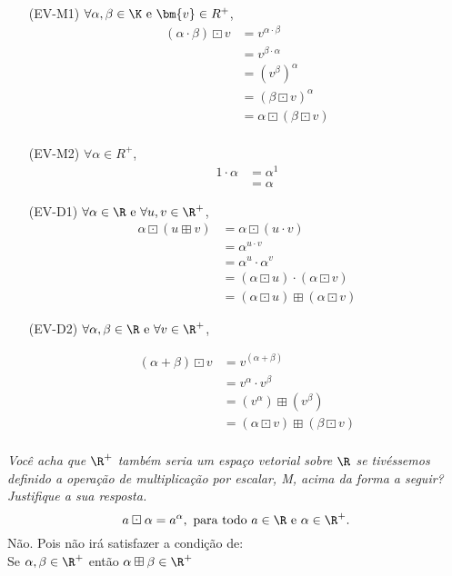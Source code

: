 \begin{itemize}

\item [(EV-M1)] $\forall \alpha, \beta \in \K \text{ e } \bm{v} \in R^{+}$, 
\begin{align*}
    (\alpha \cdot \beta)\boxdot v
    &= v^{\alpha \cdot \beta} \\
    &= v^{\beta \cdot \alpha} \\
    &= (v^\beta)^\alpha \\
    &= (\beta \boxdot v)^\alpha \\
    &= \alpha \boxdot (\beta \boxdot v) \\
\end{align*}


\item [(EV-M2)] $\forall \alpha \in R^{+}$,
\begin{align*}
    1 \cdot \alpha &= \alpha ^1 \\
              &= \alpha
\end{align*}
\end{itemize}

\begin{itemize}
\item [(EV-D1)] $\forall \alpha \in \R \text{ e } \forall u, v \in \R^{+}$,
    \begin{align*}
        \alpha \boxdot (u \boxplus v) &= \alpha \boxdot (u \cdot v) \\
        &= \alpha^{u \cdot v} \\
        &= \alpha^u \cdot \alpha^v \\
        &= (\alpha \boxdot u) \cdot (\alpha \boxdot v) \\
        &= (\alpha \boxdot u) \boxplus (\alpha \boxdot v)
    \end{align*}

\item [(EV-D2)] $\forall \alpha, \beta \in \R \text{ e } \forall v \in \R^{+}$,

\begin{align*}
    (\alpha + \beta) \boxdot v
    &= v^(\alpha + \beta) \\
    &= v^\alpha \cdot v^\beta \\
    &= (v^\alpha) \boxplus (v^\beta) \\
    &= (\alpha \boxdot v) \boxplus (\beta \boxdot v) \\
\end{align*}

\end{itemize}
\textit{Você acha  que $\R^+$  também seria um  espaço vetorial sobre  $\R$ se
tivéssemos definido a  operação de \textit{multiplicação por escalar},
M, acima da forma a seguir? Justifique a sua res\-pos\-ta.}
\[
a \boxdot  \alpha = a^{\alpha},~\text{para  todo $a \in \R$  e $\alpha
  \in \R^+$.}
\]
Não. Pois não irá satisfazer a condição de: \\
Se $\alpha, \beta \in \R^{+}$ então $\alpha \boxplus \beta \in \R^{+}$


